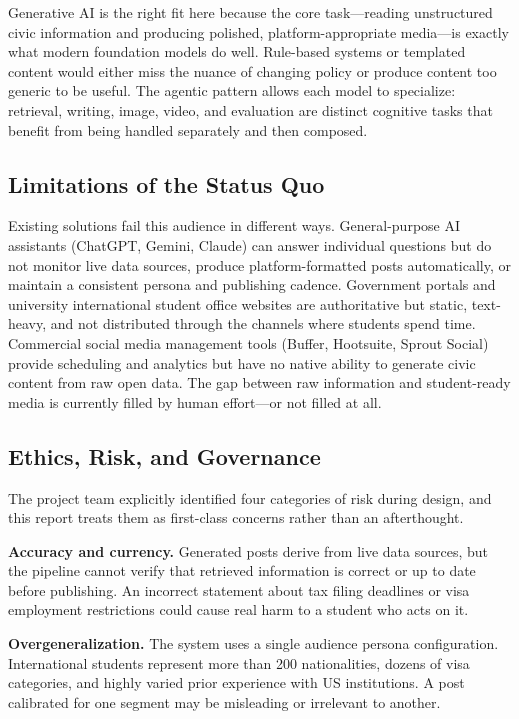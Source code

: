 \documentclass[12pt, letterpaper]{article}
\begin{document}
Generative AI is the right fit here because the core task---reading unstructured
civic information and producing polished, platform-appropriate media---is exactly what
modern foundation models do well. Rule-based systems or templated content would either
miss the nuance of changing policy or produce content too generic to be useful. The
agentic pattern allows each model to specialize: retrieval, writing, image, video,
and evaluation are distinct cognitive tasks that benefit from being handled separately
and then composed.

\subsection{Limitations of the Status Quo}

Existing solutions fail this audience in different ways. General-purpose AI assistants
(ChatGPT, Gemini, Claude) can answer individual questions but do not monitor live
data sources, produce platform-formatted posts automatically, or maintain a consistent
persona and publishing cadence. Government portals and university international student
office websites are authoritative but static, text-heavy, and not distributed through
the channels where students spend time. Commercial social media management tools
(Buffer, Hootsuite, Sprout Social) provide scheduling and analytics but have no native
ability to generate civic content from raw open data. The gap between raw information
and student-ready media is currently filled by human effort---or not filled at all.

\subsection{Ethics, Risk, and Governance}

The project team explicitly identified four categories of risk during design, and this
report treats them as first-class concerns rather than an afterthought.

\textbf{Accuracy and currency.} Generated posts derive from live data sources, but
the pipeline cannot verify that retrieved information is correct or up to date before
publishing. An incorrect statement about tax filing deadlines or visa employment
restrictions could cause real harm to a student who acts on it.

\textbf{Overgeneralization.} The system uses a single audience persona configuration.
International students represent more than 200 nationalities, dozens of visa categories,
and highly varied prior experience with US institutions. A post calibrated for one
segment may be misleading or irrelevant to another.
\end{document}
